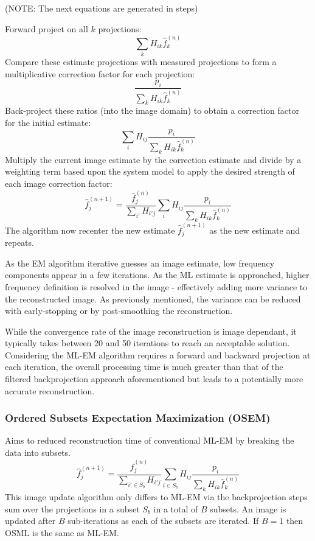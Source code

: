 \documentclass{article}
\begin{document}
(NOTE: The next equations are generated in steps)

Forward project on all $k$ projections:
\begin{equation}
	\sum_k H_{ik} \hat{f}_k ^{(n)}
\end{equation}
Compare these estimate projections with measured projections to form a multiplicative correction factor for each projection:
\begin{equation}
	\frac{p_i}{\sum_k H_{ik} \hat{f}_k ^{(n)}}
\end{equation}
Back-project these ratios (into the image domain) to obtain a correction factor for the initial estimate:
\begin{equation}
	\sum_i H_{ij}\frac{p_i}{\sum_k H_{ik} \hat{f}_k ^{(n)}}
\end{equation}
Multiply the current image estimate by the correction estimate and divide by a weighting term based upon the system model to apply the desired strength of each image correction factor:
\begin{equation}
	\hat{f}_j^{(n+1)} = \frac{\hat{f}_j^{(n)}}{\sum_{i'} H_{i'j}}\sum_i H_{ij}\frac{p_i}{\sum_k H_{ik} \hat{f}_k ^{(n)}}
    \label{eq.ML-EMiteration}
\end{equation}
The algorithm now recenter the new estimate $\hat{f}_j^{(n+1)}$ as the new estimate and repeats.

As the EM algorithm iterative guesses an image estimate, low frequency components appear in a few iterations. As the ML estimate is approached, higher frequency  definition is resolved in the image - effectively adding more variance to the reconstructed image. As previously mentioned, the variance can be reduced with early-stopping or by post-smoothing the reconstruction. 

While the convergence rate of the image reconstruction is image dependant, it typically takes between 20 and 50 iterations to reach an acceptable solution. Considering the ML-EM algorithm requires a forward and backward  projection at each iteration, the overall processing time is much greater than that of the filtered backprojection approach aforementioned but leads to a potentially more accurate reconstruction. 

\subsubsection{Ordered Subsets Expectation Maximization (OSEM)}
Aims to reduced reconstruction time of conventional ML-EM by breaking the data into subsets.
\begin{equation}
	\hat{f}_j^{(n+1)} = \frac{\hat{f}_j^{(n)}}{\sum_{i'\in S_b} H_{i'j}}\sum_{i \in S_b} H_{ij}\frac{p_i}{\sum_k H_{ik} \hat{f}_k ^{(n)}}
    \label{eq.OSEMiteration}
\end{equation}
This image update algorithm only differs to ML-EM via the backprojection steps sum over the projections in a subset $S_b$ in a total of $B$ subsets. An image is updated after $B$ sub-iterations as each of the subsets are iterated. If $B=1$ then OSML is the same as ML-EM.
\end{document}
